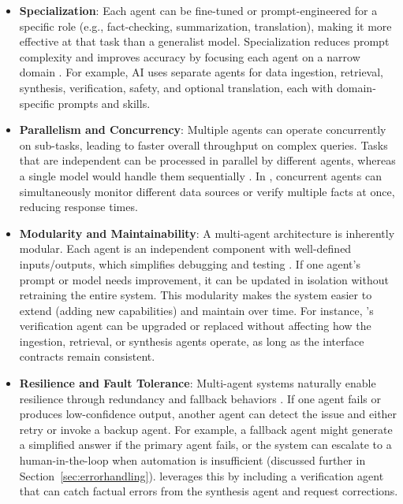 \begin{itemize}
    \item \textbf{Specialization}: Each agent can be fine-tuned or prompt-engineered for a specific role (e.g., fact-checking, summarization, translation), making it more effective at that task than a generalist model. Specialization reduces prompt complexity and improves accuracy by focusing each agent on a narrow domain \cite{blogLangChain}. For example, \ishtar{} AI uses separate agents for data ingestion, retrieval, synthesis, verification, safety, and optional translation, each with domain-specific prompts and skills.
    
    \item \textbf{Parallelism and Concurrency}: Multiple agents can operate concurrently on sub-tasks, leading to faster overall throughput on complex queries. Tasks that are independent can be processed in parallel by different agents, whereas a single model would handle them sequentially \cite{blogLangChain}. In \ishtar{}, concurrent agents can simultaneously monitor different data sources or verify multiple facts at once, reducing response times.
    
    \item \textbf{Modularity and Maintainability}: A multi-agent architecture is inherently modular. Each agent is an independent component with well-defined inputs/outputs, which simplifies debugging and testing \cite{v7labs}. If one agent's prompt or model needs improvement, it can be updated in isolation without retraining the entire system. This modularity makes the system easier to extend (adding new capabilities) and maintain over time. For instance, \ishtar{}'s verification agent can be upgraded or replaced without affecting how the ingestion, retrieval, or synthesis agents operate, as long as the interface contracts remain consistent.
    
    \item \textbf{Resilience and Fault Tolerance}: Multi-agent systems naturally enable resilience through redundancy and fallback behaviors \cite{v7labs}. If one agent fails or produces low-confidence output, another agent can detect the issue and either retry or invoke a backup agent. For example, a fallback agent might generate a simplified answer if the primary agent fails, or the system can escalate to a human-in-the-loop when automation is insufficient (discussed further in Section~\ref{sec:errorhandling}). \ishtar{} leverages this by including a verification agent that can catch factual errors from the synthesis agent and request corrections.
\end{itemize}



